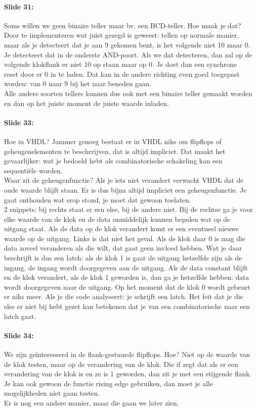 \documentclass[10pt,a4paper]{book}
\begin{document}
\paragraph{Slide 31:} Soms willen we geen binaire teller maar bv. een BCD-teller. Hoe maak je dat? Door te implementeren wat juist gezegd is geweest: tellen op normale manier, maar als je detecteert dat je aan 9 gekomen bent, is het volgende niet 10 maar 0. Je detecteert dat in de onderste AND-poort. Als we dat detecteren, dan zal op de volgende klokflank er niet 10 op staan maar op 0. Je doet dan een synchrone reset door er 0 in te laden. Dat kan in de andere richting even goed toegepast worden: van 0 naar 9 bij het naar beneden gaan.\\
Alle andere soorten tellers kunnen dus ook met een binaire teller gemaakt worden en dan op het juiste moment de juiste waarde inladen. 

\paragraph{Slide 33:} Hoe in VHDL? Jammer genoeg bestaat er in VHDL niks om flipflops of geheugenelementen te beschrrijven, dat is altijd impliciet. Dat maakt het gevaarlijker: wat je bedoeld hebt als combinatorische schakeling kan een sequenti\"ele worden.\\
Waar zit de geheugenfunctie? Als je iets niet verandert verwacht VHDL dat de oude waarde blijft staan. Er is dus bijna altijd impliciet een geheugenfunctie. Je gaat onthouden wat erop stond, je moet dat gewoon toelaten.\\
2 snippets: bij rechts staat er een else, bij de andere niet. Bij de rechtse ga je voor elke waarde van de klok en de data onmiddelijk kunnen bepalen wat op de uitgang staat. Als de data op de klok verandert komt er een eventueel nieuwe waarde op de uitgang. Links is dat niet het geval. Als de klok daar 0 is mag die data zoveel veranderen als die wilt, dat gaat geen invloed hebben. Wat je daar beschrijft is dus een latch: als de klok 1 is gaat de uitgang hetzelfde zijn als de ingang, de ingang wordt doorgegeven aan de uitgang. Als de data constant blijft en de klok verandert, als de klok 1 geworden is, dan ga je hetzelfde hebben: data wordt doorgegeven naar de uitgang. Op het moment dat de klok 0 wordt gebeurt er niks meer. Als je die code analyseert: je schrijft een latch. Het feit dat je die else er niet bij hebt gezet kan betekenen dat je van een combinatorische naar een latch gaat. 

\paragraph{Slide 34:} We zijn ge\"intereseerd in de flank-gestuurde flipflops. Hoe? Niet op de waarde van de klok testen, maar op de verandering van de klok. Die if zegt dat als er een verandering van de klok is en ze is 1 geworden, dan zit je met een stijgende flank. Je kan ook gewoon de functie rising edge gebruiken, dan moet je alle mogelijkheden niet gaan testen.\\
Er is nog een andere manier, maar die gaan we later zien. 
\end{document}
